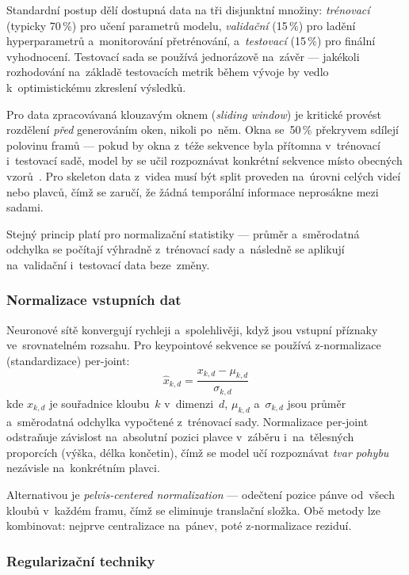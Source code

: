 Standardní postup dělí dostupná data na tři disjunktní množiny: \textit{trénovací} (typicky 70\,\%) pro učení parametrů modelu, \textit{validační} (15\,\%) pro ladění hyperparametrů a~monitorování přetrénování, a~\textit{testovací} (15\,\%) pro finální vyhodnocení. Testovací sada se používá jednorázově na~závěr --- jakékoli rozhodování na~základě testovacích metrik během vývoje by vedlo k~optimistickému zkreslení výsledků.

Pro data zpracovávaná klouzavým oknem (\textit{sliding window}) je kritické provést rozdělení \emph{před} generováním oken, nikoli po~něm. Okna se~50\,\% překryvem sdílejí polovinu framů --- pokud by okna z~téže sekvence byla přítomna v~trénovací i~testovací sadě, model by se učil rozpoznávat konkrétní sekvence místo obecných vzorů~\cite{cerda2024leakage}. Pro skeleton data z~videa musí být split proveden na~úrovni celých videí nebo plavců, čímž se zaručí, že žádná temporální informace neprosákne mezi sadami.

Stejný princip platí pro normalizační statistiky --- průměr a~směrodatná odchylka se počítají výhradně z~trénovací sady a~následně se aplikují na~validační i~testovací data beze~změny.

\subsubsection{Normalizace vstupních dat}
\label{subsubsec:normalizace}

Neuronové sítě konvergují rychleji a~spolehlivěji, když jsou vstupní příznaky ve~srovnatelném rozsahu. Pro keypointové sekvence se používá z-normalizace (standardizace) per-joint:
\begin{equation}
    \hat{x}_{k,d} = \frac{x_{k,d} - \mu_{k,d}}{\sigma_{k,d}}
    \label{eq:z_norm}
\end{equation}
kde $x_{k,d}$ je souřadnice kloubu~$k$ v~dimenzi~$d$, $\mu_{k,d}$ a~$\sigma_{k,d}$ jsou průměr a~směrodatná odchylka vypočtené z~trénovací sady. Normalizace per-joint odstraňuje závislost na~absolutní pozici plavce v~záběru i~na~tělesných proporcích (výška, délka končetin), čímž se model učí rozpoznávat \emph{tvar pohybu} nezávisle na~konkrétním plavci.

Alternativou je \textit{pelvis-centered normalization} --- odečtení pozice pánve od~všech kloubů v~každém framu, čímž se eliminuje translační složka. Obě metody lze kombinovat: nejprve centralizace na~pánev, poté z-normalizace reziduí.

\subsubsection{Regularizační techniky}
\label{subsubsec:regularizace}

